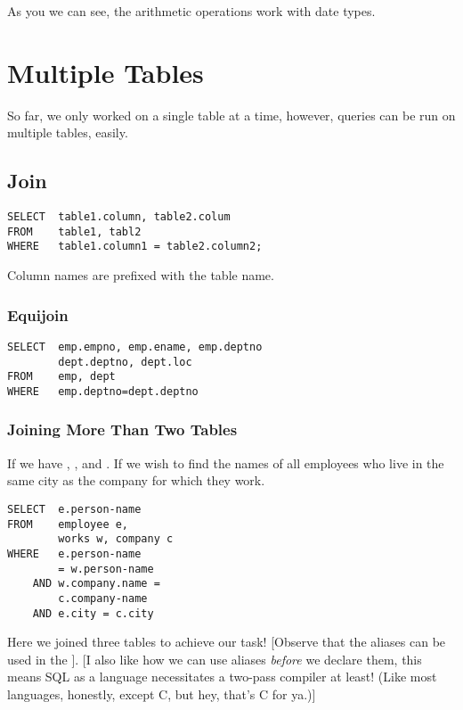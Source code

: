 \documentclass[11pt,a4paper,twocolumn]{book}
\begin{document}
As you we can see, the arithmetic operations work with date types.

\section{Multiple Tables}

So far, we only worked on a single table at a time, however, queries can be run on multiple tables, easily.

\subsection{Join}

\begin{lstlisting}
SELECT 	table1.column, table2.colum
FROM	table1, tabl2
WHERE	table1.column1 = table2.column2;
\end{lstlisting}

Column names are prefixed with the table name.

\subsubsection{Equijoin}

\begin{lstlisting}
SELECT 	emp.empno, emp.ename, emp.deptno
		dept.deptno, dept.loc
FROM	emp, dept
WHERE	emp.deptno=dept.deptno
\end{lstlisting}

\subsubsection{Joining More Than Two Tables}

If we have , ,  and . If we wish to find the names of all employees who live in the same city as the company for which they work.

\begin{lstlisting}
SELECT 	e.person-name
FROM	employee e, 
		works w, company c
WHERE	e.person-name 
		= w.person-name
	AND w.company.name = 
		c.company-name
	AND e.city = c.city
\end{lstlisting}

Here we joined three tables to achieve our task! [Observe that the aliases can be used in the ]. [I also like how we can use aliases \textit{before} we declare them, this means SQL as a language necessitates a two-pass compiler at least! (Like most languages, honestly, except C, but hey, that's C for ya.)]
\end{document}
